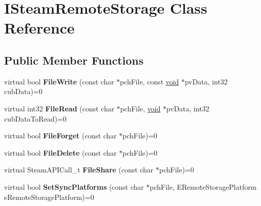 \hypertarget{classISteamRemoteStorage}{}\section{I\+Steam\+Remote\+Storage Class Reference}
\label{classISteamRemoteStorage}
\subsection*{Public Member Functions}
\begin{DoxyCompactItemize}
\item 
\hypertarget{classISteamRemoteStorage_aa0d868a38be6aa989ac94100952a0614}{}virtual bool {\bfseries File\+Write} (const char $\ast$pch\+File, const \hyperlink{SDL__audio_8h_a52835ae37c4bb905b903cbaf5d04b05f}{void} $\ast$pv\+Data, int32 cub\+Data)=0\label{classISteamRemoteStorage_aa0d868a38be6aa989ac94100952a0614}

\item 
\hypertarget{classISteamRemoteStorage_a79a08acfbc61197dc0c67de155ac9bc3}{}virtual int32 {\bfseries File\+Read} (const char $\ast$pch\+File, \hyperlink{SDL__audio_8h_a52835ae37c4bb905b903cbaf5d04b05f}{void} $\ast$pv\+Data, int32 cub\+Data\+To\+Read)=0\label{classISteamRemoteStorage_a79a08acfbc61197dc0c67de155ac9bc3}

\item 
\hypertarget{classISteamRemoteStorage_a3afa4e53889382d6d1d6b97b4d054e86}{}virtual bool {\bfseries File\+Forget} (const char $\ast$pch\+File)=0\label{classISteamRemoteStorage_a3afa4e53889382d6d1d6b97b4d054e86}

\item 
\hypertarget{classISteamRemoteStorage_a1479b88a77c9d28d07cafbb817934ac2}{}virtual bool {\bfseries File\+Delete} (const char $\ast$pch\+File)=0\label{classISteamRemoteStorage_a1479b88a77c9d28d07cafbb817934ac2}

\item 
\hypertarget{classISteamRemoteStorage_a251f7b72fcd44853deebf9d38c09a7e8}{}virtual Steam\+A\+P\+I\+Call\+\_\+t {\bfseries File\+Share} (const char $\ast$pch\+File)=0\label{classISteamRemoteStorage_a251f7b72fcd44853deebf9d38c09a7e8}

\item 
\hypertarget{classISteamRemoteStorage_aa05d5c5a5b724c410b24f8cea017a61a}{}virtual bool {\bfseries Set\+Sync\+Platforms} (const char $\ast$pch\+File, E\+Remote\+Storage\+Platform e\+Remote\+Storage\+Platform)=0\label{classISteamRemoteStorage_aa05d5c5a5b724c410b24f8cea017a61a}


\end{DoxyCompactItemize}
